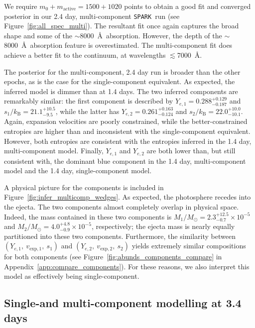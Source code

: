 \documentclass[twocolumn,twocolappendix]{aastex63}
\def\SPARK{\texttt{SPARK}}
\begin{document}
We require $m_0 + m_{\mathrm{active}} = 1500 + 1020$ points to obtain a good fit and converged posterior in our 2.4 day, multi-component \SPARK~run (see Figure~\ref{fig:all_spec_multi}). The resultant fit once again captures the broad shape and some of the $\sim$8000~\AA~absorption. However, the depth of the $\sim$8000~\AA~absorption feature is overestimated. The multi-component fit does achieve a better fit to the continuum, at wavelengths $\lesssim$7000~\AA. 

The posterior for the multi-component, 2.4 day run is broader than the other epochs, as is the case for the single-component equivalent. As expected, the inferred model is dimmer than at 1.4 days. The two inferred components are remarkably similar: the first component is described by $Y_{e,1} = 0.288^{+0.129}_{-0.187}$ and $s_1 / k_{\mathrm{B}} = 21.1^{+10.5}_{-9.5}$, while the latter has $Y_{e,2} = 0.261^{+0.163}_{-0.124}$ and $s_2 / k_{\mathrm{B}} = 22.0^{+10.0}_{-10.1}$. Again, expansion velocities are poorly constrained, while the better-constrained entropies are higher than and inconsistent with the single-component equivalent. However, both entropies are consistent with the entropies inferred in the 1.4 day, multi-component model. Finally, $Y_{e,1}$ and $Y_{e,2}$ are both lower than, but still consistent with, the dominant blue component in the 1.4 day, multi-component model and the 1.4 day, single-component model.

A physical picture for the components is included in Figure~\ref{fig:infer_multicomp_wedges}. As expected, the photosphere recedes into the ejecta. The two components almost completely overlap in physical space. Indeed, the mass contained in these two components is $M_1/M_{\odot} = 2.3^{+12.5}_{-0.7} \times 10^{-5}$ and $M_2/M_{\odot} = 4.0^{+4.8}_{-0.9} \times 10^{-5}$, respectively; the ejecta mass is nearly equally partitioned into these two components. Furthermore, the similarity between $(Y_{e,1},~v_{\mathrm{exp},1},~s_1)$ and $(Y_{e,2},~v_{\mathrm{exp},2},~s_2)$ yields extremely similar compositions for both components (see Figure~\ref{fig:abunds_components_compare} in Appendix~\ref{app:compare_components}). For these reasons, we also interpret this model as effectively being single-component.




\subsection{Single-and multi-component modelling at 3.4 days}\label{ssc:3.4}
\end{document}
